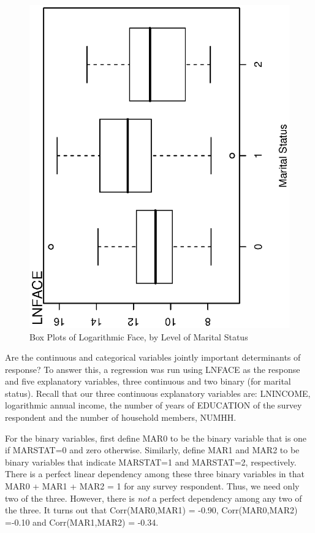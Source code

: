 \begin{figure}[htp]
  \begin{center}
    \includegraphics[width=1\textwidth,angle=270,scale=0.5]{Chapter4/F4BoxFACEMARSTAT.ps}
       \caption{\label{F4:BoxFACEMARSTAT} \small  Box Plots of Logarithmic Face, by Level of Marital Status}
  \end{center}
\end{figure}

Are the continuous and categorical variables jointly important
determinants of response? To answer this, a regression was run using
LNFACE as the response and five explanatory variables, three
continuous and two binary (for marital status). Recall that our
three continuous explanatory variables are:  LNINCOME, logarithmic
annual income, the number of years of EDUCATION of the survey
respondent and the number of household members, NUMHH.

For the binary variables, first define MAR0 to be the binary
variable that is one if MARSTAT=0 and zero otherwise. Similarly,
define MAR1 and MAR2 to be binary variables that indicate MARSTAT=1
and MARSTAT=2, respectively. There is a perfect linear dependency
among these three binary variables in that MAR0 + MAR1 + MAR2 = 1
for any survey respondent. Thus, we need only two of the three.
However, there is \emph{not} a perfect dependency among any two of
the three. It turns out that Corr(MAR0,MAR1) = -0.90,
Corr(MAR0,MAR2) =-0.10 and Corr(MAR1,MAR2) = -0.34.

